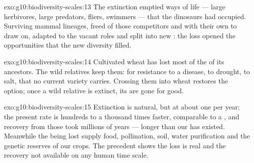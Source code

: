 \begin{solution}{exo:g10:biodiversity-scales:13}
The extinction emptied ways of life --- large herbivores, large
predators, fliers, swimmers --- that the dinosaurs had occupied.
Surviving mammal lineages, freed of those competitors and with their
own  to draw on, adapted to the vacant roles and
split into new : the loss opened the opportunities that the
new diversity filled.
\end{solution}

\begin{solution}{exo:g10:biodiversity-scales:14}
Cultivated wheat has lost most of the  of its ancestors. The
wild relatives keep them:  for resistance to a disease, to
drought, to salt, that no current variety carries. Crossing them into
wheat restores the option; once a wild relative is extinct, its 
are gone for good.
\end{solution}

\begin{solution}{exo:g10:biodiversity-scales:15}
Extinction is natural, but at about one  per year; the present
rate is hundreds to a thousand times faster, comparable to a , and recovery from those took millions of years --- longer
than our  has existed. Meanwhile the  being lost
supply food, pollination, soil, water purification and the genetic
reserves of our crops. The precedent shows the loss is real and the
recovery not available on any human time scale.
\end{solution}

